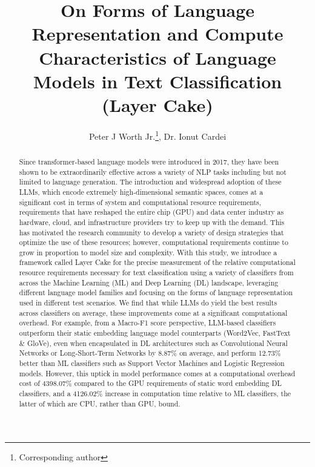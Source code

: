 \documentclass[final]{clv2025}
\begin{document}
\title{On Forms of Language Representation and Compute Characteristics of Language Models in Text Classification (Layer Cake)}

\author{Peter J Worth Jr.\thanks{Corresponding author}, Dr. Ionut Cardei}


\maketitle

\begin{abstract}
Since transformer-based language models were introduced in 2017, they have been shown to be extraordinarily effective across a variety of NLP tasks including but not limited to language generation. The introduction and widespread adoption of these LLMs, which encode extremely high-dimensional semantic spaces, comes at a significant cost in terms of system and computational resource requirements, requirements that have reshaped the entire chip (GPU) and data center industry as hardware, cloud, and infrastructure providers try to keep up with the demand. This has motivated the research community to develop a variety of design strategies that optimize the use of these resources; however, computational requirements continue to grow in proportion to model size and complexity. With this study, we introduce a framework called Layer Cake for the precise measurement of the relative computational resource requirements necessary for text classification using a variety of classifiers from across the Machine Learning (ML) and Deep Learning (DL) landscape, leveraging different language model families and focusing on the forms of language representation used in different test scenarios. We find that while LLMs do yield the best results across classifiers on average, these improvements come at a significant computational overhead. For example, from a Macro-F1 score perspective, LLM-based classifiers outperform their static embedding language model counterparts (Word2Vec, FastText \& GloVe), even when encapsulated in DL architectures such as Convolutional Neural Networks or Long-Short-Term Networks by 8.87\% on average, and perform 12.73\% better than ML classifiers such as Support Vector Machines and Logistic Regression models. However, this uptick in model performance comes at a computational overhead cost of 4398.07\% compared to the GPU requirements of static word embedding DL classifiers, and a 4126.02\% increase in computation time relative to ML classifiers, the latter of which are CPU, rather than GPU, bound.
\end{abstract}
\end{document}
